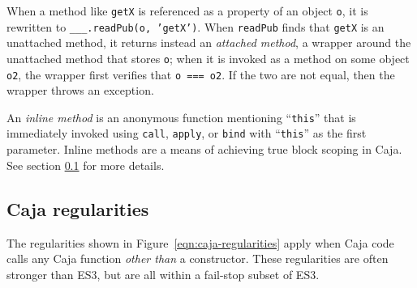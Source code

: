 \documentclass[letterpaper,twocolumn,10pt]{article}
\newcommand{\code}[1]{{\tt {#1}}}              %
\begin{document}
\begin{description}
  When a method like \code{getX} is referenced as a property of an object \code{o}, 
  it is rewritten to \code{\_\_\_.readPub(o, 'getX')}.  When \code{readPub} finds that \code{getX} is an unattached method,
  it returns instead an \emph{attached method}, a wrapper around the unattached method that stores \code{o}; when it is 
  invoked as a method on some object \code{o2}, the wrapper first verifies that \code{o === o2}.  If the two are not equal, 
  then the wrapper throws an exception.
  
  An \emph{inline method} is an anonymous function mentioning ``\code{this}'' that is immediately invoked using \code{call}, \code{apply},
  or \code{bind} with ``\code{this}'' as the first parameter.  Inline methods are a means of achieving true block scoping in Caja.  
  See section \ref{subsec:caja-reg} for more details.
\end{description}


\subsection{Caja regularities}
\label{subsec:caja-reg}

The regularities shown in Figure~\ref{eqn:caja-regularities} apply when Caja code calls any Caja function 
\emph{other than} a constructor. These regularities are often stronger than ES3, but are all within a 
fail-stop subset of ES3. 
\end{document}
